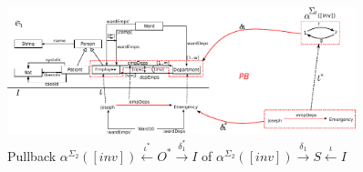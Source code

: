 \documentclass{eceasst}
\begin{document}
\begin{figure}[t]
\centering
 \includegraphics[width=0.9\textwidth]{entity-1-pullback.pdf}
 \caption{ Pullback $\alpha^{\Sigma_2}([inv]) \xleftarrow{\iota^*} O^* \xrightarrow{\delta_1^*} I $ of $\alpha^{\Sigma_2}([inv]) \xrightarrow{\delta_1} S \xleftarrow{\iota} I $ }
 \label{fig:entity-pb}
 \end{figure}
 
\end{document}
